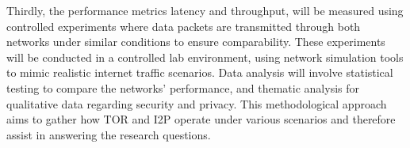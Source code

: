 \documentclass[12pt,conference]{IEEEtran}
\begin{document}
Thirdly, the performance metrics latency and throughput, will be measured using controlled experiments where data packets are transmitted through both networks under similar conditions to ensure comparability. These experiments will be conducted in a controlled lab environment, using network simulation tools to mimic realistic internet traffic scenarios. Data analysis will involve statistical testing to compare the networks' performance, and thematic analysis for qualitative data regarding security and privacy. This methodological approach aims to gather how TOR and I2P operate under various scenarios and therefore assist in answering the research questions. 




\end{document}

